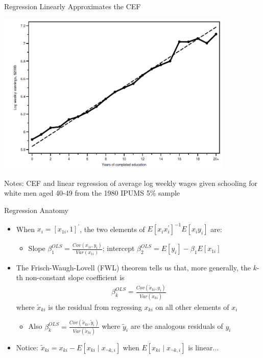 \documentclass[11pt,english]{beamer}
\begin{document}
\begin{frame}{Regression Linearly Approximates the CEF}

\begin{center}
\includegraphics[width=0.85\textwidth]{figures/CEF2.png}
\end{center}
\smallskip

\footnotesize{Notes: CEF and linear regression of average log weekly wages given
schooling for white men aged 40-49 from the 1980 IPUMS 5\% sample}


\end{frame}

\begin{frame}{Regression Anatomy}
\begin{itemize}
\item When $x_i=[x_{1i},1]^\prime$, the two elements of $E[x_ix_i^\prime]^{-1}E[x_iy_i]$ are:\smallskip
\begin{itemize}
\item Slope $\beta_1^{OLS}=\frac{Cov(x_{1i},y_i)}{Var(x_{1i})}$; intercept $\beta_2^{OLS}=E[y_i]-\beta_1 E[x_{1i}]$
\end{itemize}\bigskip\pause{}
\item The Frisch-Waugh-Lovell (FWL) theorem tells us that, more generally, the $k$-th non-constant slope coefficient is 
\begin{align*}
\beta_{k}^{OLS}=\frac{Cov(\tilde{x}_{ki},y_i)}{Var(\tilde{x}_{ki})}
\end{align*}
where $\tilde{x}_{ki}$ is the residual from regressing $x_{ki}$ on all other elements of $x_i$\smallskip
\begin{itemize}\pause{}
\item Also $\beta_{k}^{OLS}=\frac{Cov(\tilde{x}_{ki},\tilde{y}_i)}{Var(\tilde{x}_{ki})}$ where $\tilde{y}_i$ are the analogous residuals of $y_i$
\end{itemize}\bigskip\pause{}
\item Notice: $\tilde{x}_{ki}=x_{ki}-E[x_{ki}\mid x_{\neg k,i}]$ when $E[x_{ki}\mid x_{\neg k,i}]$ is linear...
\end{itemize}

\end{frame}
\end{document}
